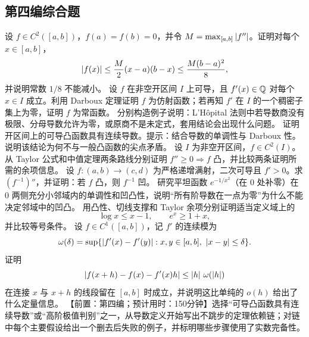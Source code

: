 \subsection*{第四编综合题}
\begin{enumerate}[label=\textbf{\thechapter.\arabic*.},resume]
  设 \(f\in C^2([a,b])\)，\(f(a)=f(b)=0\)，并令 \(M=\max_{[a,b]}\left|f''\right|\)。证明对每个 \(x\in[a,b]\)，
 \[
  \left|f(x)\right|\le\frac{M}{2}(x-a)(b-x)\le\frac{M(b-a)^2}{8},
 \]
 并说明常数 \(1/8\) 不能减小。
  设 \(f\) 在非空开区间 \(I\) 上可导，且 \(f'(x)\in\mathbb{Q}\) 对每个 \(x\in I\) 成立。利用 Darboux 定理证明 \(f\) 为仿射函数；若再知 \(f'\) 在 \(I\) 的一个稠密子集上为零，证明 \(f\) 为常函数。
  分别构造例子说明：L'H\^opital 法则中若导数商没有极限、分母导数允许为零，或原商不是未定式，套用结论会出现什么问题。
  证明开区间上的可导凸函数具有连续导数。提示：结合导数的单调性与 Darboux 性。说明该结论为何不与一般凸函数的尖点矛盾。
  设 \(I\) 为非空开区间，\(f\in C^2(I)\)。从 Taylor 公式和中值定理两条路线分别证明 \(f''\ge0\Rightarrow f\) 凸，并比较两条证明所需的余项信息。
  设 \(f:(a,b)\to(c,d)\) 为严格递增满射，二次可导且 \(f'>0\)。求 \((f^{-1})''\)，并证明：若 \(f\) 凸，则 \(f^{-1}\) 凹。
  研究平坦函数 \(e^{-1/x^2}\)（在 \(0\) 处补零）在 \(0\) 两侧充分小邻域内的单调性和凹凸性，说明“所有阶导数在一点为零”为什么不能决定邻域中的凹凸。
  用凸性、切线支撑和 Taylor 余项分别证明适当定义域上的
 \[
  \log x\le x-1,
  \qquad e^x\ge1+x,
 \]
 并比较等号条件。
  设 \(f\in C^1([a,b])\)，记 \(f'\) 的连续模为
 \[
  \omega(\delta)=\sup\{\abs{f'(x)-f'(y)}:x,y\in[a,b],\ \abs{x-y}\le\delta\}.
 \]
 证明
 \[
  \left|f(x+h)-f(x)-f'(x)h\right|\le \left|h\right|\,\omega(\left|h\right|)
 \]
 在连接 \(x\) 与 \(x+h\) 的线段留在 \([a,b]\) 时成立，并说明这比单纯的 \(o(h)\) 给出了什么定量信息。
  【前置：第四编；预计用时：150分钟】选择“可导凸函数具有连续导数”或“高阶极值判别”之一，从导数定义开始写出不跳步的定理依赖链；对链中每个主要假设给出一个删去后失败的例子，并标明哪些步骤使用了实数完备性。
\end{enumerate}
